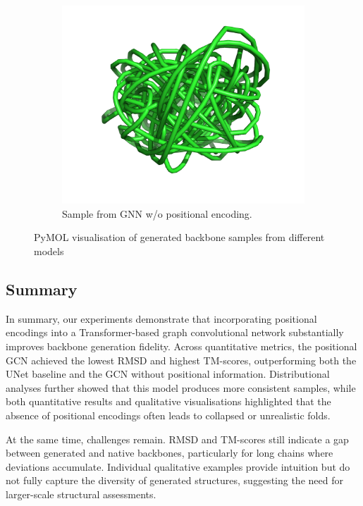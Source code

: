 \documentclass[a4paper,12pt]{article}
\begin{document}
\begin{figure}[htbp]
\begin{subfigure}[b]{0.495\textwidth}
        \label{fig:sample-pos}
    \end{subfigure}
    \begin{subfigure}[b]{0.48\textwidth}
        \centering
        \includegraphics[width=\linewidth]{1a6fA00_gen_wo_pos.png}
        \caption{Sample from GNN w/o positional encoding.}
        \label{fig:sample-wo-pos}
    \end{subfigure}
    \caption{PyMOL visualisation of generated backbone samples from different models}
    \label{fig:samples}
\end{figure}

\subsection{Summary}\label{subsec:experiments-summary}
In summary, our experiments demonstrate that incorporating positional encodings into a Transformer-based graph convolutional network substantially improves backbone generation fidelity. Across quantitative metrics, the positional GCN achieved the lowest RMSD and highest TM-scores, outperforming both the UNet baseline and the GCN without positional information. Distributional analyses further showed that this model produces more consistent samples, while both quantitative results and qualitative visualisations highlighted that the absence of positional encodings often leads to collapsed or unrealistic folds.

At the same time, challenges remain. RMSD and TM-scores still indicate a gap between generated and native backbones, particularly for long chains where deviations accumulate. Individual qualitative examples provide intuition but do not fully capture the diversity of generated structures, suggesting the need for larger-scale structural assessments.
\end{document}
